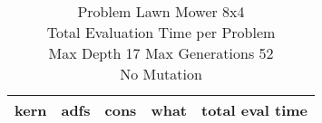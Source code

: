 \begin{table}[H]
\caption{Problem  Lawn Mower 8x4\\Total Evaluation Time per Problem \\ Max Depth 17 Max Generations 52\\ No Mutation \\}
\begin{center}
\scalebox{1.0} %
{
\begin{tabular}{llllr}
\hline
kern & adfs & cons & what & total eval time \\
\hline


\end{tabular}
}
\end{center}
\end{table}

